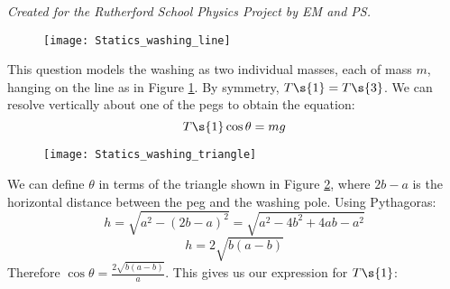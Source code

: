 
\begin{problem} 
{ 
}
{\textit{Created for the Rutherford School Physics Project by EM and PS.}}
{\begin{figure} [h]
	\centering
	\texttt{[image: Statics\_washing\_line]}
	\caption{}
	\label{fig:Statics_washing_line}
\end{figure}
This question models the washing as two individual masses, each of mass $m$, hanging on the line as in Figure \ref{fig:Statics_washing_line}. By symmetry, $T\s{1} = T\s{3}$. We can resolve vertically about one of the pegs to obtain the equation:
\begin{equation*}	T\s{1}\cos{\theta} = mg	\end{equation*}
\begin{figure} [h]
	\centering
	\texttt{[image: Statics\_washing\_triangle]}
	\caption{}
	\label{fig:Statics_washing_triangle}
\end{figure}
We can define $\theta$ in terms of the triangle shown in Figure \ref{fig:Statics_washing_triangle}, where $2b - a$ is the horizontal distance between the peg and the washing pole. Using Pythagoras:
\begin{equation*}	h = \sqrt{a^{2} - \left(2b - a\right)^{2}} = \sqrt{a^{2} - 4b^{2} + 4ab - a^{2}}	\end{equation*}
\begin{equation*}	h = 2\sqrt{b\left(a - b\right)}	\end{equation*}
Therefore $\cos{\theta} = \frac{2\sqrt{b\left(a - b\right)}}{a}$. This gives us our expression for $T\s{1}$:
}
\end{problem}
